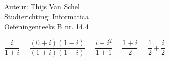 \documentclass[a4paper]{article}
\begin{document}
  
\noindent \large Auteur: Thijs Van Schel \\
\noindent \large Studierichting: Informatica\\
\noindent \large Oefeningenreeks B nr. 14.4\\

\medskip

\normalsize

$\dfrac{i}{1+i} = \dfrac{(0+i)(1-i)}{(1+i)(1-i)} = \dfrac{i-i^2}{1+1} = \dfrac{1+i}{2} = \dfrac{1}{2} + \dfrac{i}{2}$

\begin{thebibliography}{999}
\end{thebibliography}
\end{document}
